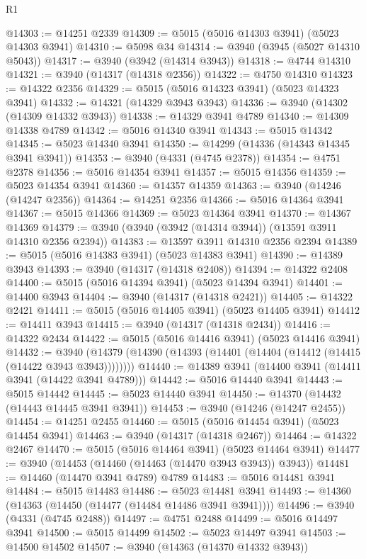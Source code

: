 \begin{lexlean}{R1}
\begin{coremodule}
@14303 := @14251 @2339
@14309 := @5015 (@5016 @14303 @3941) (@5023 @14303 @3941)
@14310 := @5098 @34
@14314 := @3940 (@3945 (@5027 @14310 @5043))
@14317 := @3940 (@3942 (@14314 @3943))
@14318 := @4744 @14310
@14321 := @3940 (@14317 (@14318 @2356))
@14322 := @4750 @14310
@14323 := @14322 @2356
@14329 := @5015 (@5016 @14323 @3941) (@5023 @14323 @3941)
@14332 := @14321 (@14329 @3943 @3943)
@14336 := @3940 (@14302 (@14309 @14332 @3943))
@14338 := @14329 @3941 @4789
@14340 := @14309 @14338 @4789
@14342 := @5016 @14340 @3941
@14343 := @5015 @14342
@14345 := @5023 @14340 @3941
@14350 := @14299 (@14336 (@14343 @14345 @3941 @3941))
@14353 := @3940 (@4331 (@4745 @2378))
@14354 := @4751 @2378
@14356 := @5016 @14354 @3941
@14357 := @5015 @14356
@14359 := @5023 @14354 @3941
@14360 := @14357 @14359
@14363 := @3940 (@14246 (@14247 @2356))
@14364 := @14251 @2356
@14366 := @5016 @14364 @3941
@14367 := @5015 @14366
@14369 := @5023 @14364 @3941
@14370 := @14367 @14369
@14379 := @3940 (@3940 (@3942 (@14314 @3944)) (@13591 @3911 @14310 @2356 @2394))
@14383 := @13597 @3911 @14310 @2356 @2394
@14389 := @5015 (@5016 @14383 @3941) (@5023 @14383 @3941)
@14390 := @14389 @3943
@14393 := @3940 (@14317 (@14318 @2408))
@14394 := @14322 @2408
@14400 := @5015 (@5016 @14394 @3941) (@5023 @14394 @3941)
@14401 := @14400 @3943
@14404 := @3940 (@14317 (@14318 @2421))
@14405 := @14322 @2421
@14411 := @5015 (@5016 @14405 @3941) (@5023 @14405 @3941)
@14412 := @14411 @3943
@14415 := @3940 (@14317 (@14318 @2434))
@14416 := @14322 @2434
@14422 := @5015 (@5016 @14416 @3941) (@5023 @14416 @3941)
@14432 := @3940 (@14379 (@14390 (@14393 (@14401 (@14404 (@14412 (@14415 (@14422 @3943 @3943))))))))
@14440 := @14389 @3941 (@14400 @3941 (@14411 @3941 (@14422 @3941 @4789)))
@14442 := @5016 @14440 @3941
@14443 := @5015 @14442
@14445 := @5023 @14440 @3941
@14450 := @14370 (@14432 (@14443 @14445 @3941 @3941))
@14453 := @3940 (@14246 (@14247 @2455))
@14454 := @14251 @2455
@14460 := @5015 (@5016 @14454 @3941) (@5023 @14454 @3941)
@14463 := @3940 (@14317 (@14318 @2467))
@14464 := @14322 @2467
@14470 := @5015 (@5016 @14464 @3941) (@5023 @14464 @3941)
@14477 := @3940 (@14453 (@14460 (@14463 (@14470 @3943 @3943)) @3943))
@14481 := @14460 (@14470 @3941 @4789) @4789
@14483 := @5016 @14481 @3941
@14484 := @5015 @14483
@14486 := @5023 @14481 @3941
@14493 := @14360 (@14363 (@14450 (@14477 (@14484 @14486 @3941 @3941))))
@14496 := @3940 (@4331 (@4745 @2488))
@14497 := @4751 @2488
@14499 := @5016 @14497 @3941
@14500 := @5015 @14499
@14502 := @5023 @14497 @3941
@14503 := @14500 @14502
@14507 := @3940 (@14363 (@14370 @14332 @3943))

\end{coremodule}
\end{lexlean}
